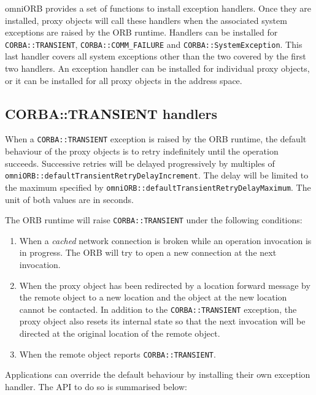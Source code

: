 \documentclass[11pt,twoside,a4paper]{book}
\newcommand{\code}[1]{\texttt{#1}}
\newcommand{\dsc}{\discretionary{}{}{}}
\begin{document}
omniORB provides a set of functions to install exception handlers.
Once they are installed, proxy objects will call these handlers when
the associated system exceptions are raised by the ORB runtime.
Handlers can be installed for \code{CORBA::\dsc{}TRANSIENT},
\code{CORBA::COMM\_FAILURE} and \code{CORBA::SystemException}.  This
last handler covers all system exceptions other than the two covered
by the first two handlers. An exception handler can be installed for
individual proxy objects, or it can be installed for all proxy objects
in the address space.


\subsection{CORBA::TRANSIENT handlers}

When a \code{CORBA::TRANSIENT} exception is raised by the ORB runtime,
the default behaviour of the proxy objects is to retry indefinitely
until the operation succeeds. Successive retries will be delayed
progressively by multiples of
\code{omniORB::\dsc{}defaultTransientRetryDelayIncrement}. The delay
will be limited to the maximum specified by
\code{omniORB::defaultTransientRetryDelayMaximum}. The unit of both
values are in seconds.

The ORB runtime will raise \code{CORBA::TRANSIENT} under the following
conditions:

\begin{enumerate}

\item When a \emph{cached} network connection is broken while an
operation invocation is in progress. The ORB will try to open a new
connection at the next invocation.

\item When the proxy object has been redirected by a location forward
message by the remote object to a new location and the object at the
new location cannot be contacted. In addition to the
\code{CORBA::TRANSIENT} exception, the proxy object also resets its
internal state so that the next invocation will be directed at the
original location of the remote object.

\item When the remote object reports \code{CORBA::TRANSIENT}.

\end{enumerate}

Applications can override the default behaviour by installing their
own exception handler. The API to do so is summarised below:
\end{document}
